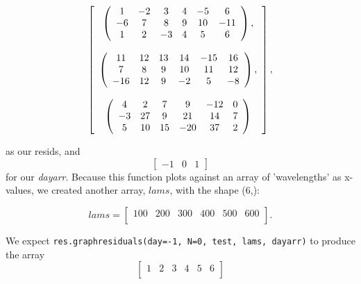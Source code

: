 \documentclass{article}
\begin{document}
\[ \left[ \begin{array}[c]{c}
    
    \left( \begin{array}[c]{cccccc}
        1 & -2 & 3 & 4 & -5 & 6 \\
        -6 & 7 & 8 & 9 & 10 & -11 \\
        1 & 2 & -3 & 4 & 5 & 6
        \end{array} \right), \\

      \\

    \left( \begin{array}[c]{cccccc}
        11 & 12 & 13 & 14 & -15 & 16 \\
        7 & 8 & 9 & 10 & 11 & 12 \\
        -16 & 12 & 9 & -2 & 5 & -8 \\
        \end{array} \right), \\

      \\

    \left( \begin{array}[c]{cccccc}
        4 & 2 & 7 & 9 & -12 & 0 \\
        -3 & 27 & 9 & 21 & 14 & 7 \\
        5 & 10 & 15 & -20 & 37 & 2 \\
    \end{array} \right)

\end{array} \right], \]

as our resids, and \[\left[\begin{array}{ccc} -1 & 0 &
    1 \end{array}\right] \] for our \textit{dayarr}.  Because this
function plots against an array of 'wavelengths' as x-values, we
created another array, $lams$, with the shape (6,):

\[ lams= \left[ \begin{array}{cccccc}
    100 & 200 & 300 & 400 & 500 & 600 \\
\end{array} \right]. \]

We expect \verb|res.graphresiduals(day=-1, N=0, test, lams, dayarr)|
to produce the array
\[ \left[ \begin{array}{cccccc}
1 & 2 & 3 & 4 & 5 & 6 \\
\end{array} \right] \]
\end{document}

